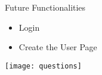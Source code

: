 \documentclass{beamer}
\begin{document}

\begin{frame}{Future Functionalities}

\begin{itemize}
	\item Login
	\item Create the User Page
\end{itemize}

\end{frame}


\begin{frame}

\centering
\texttt{[image: questions]}


\hspace{113cm}

\end{frame}
\end{document}
